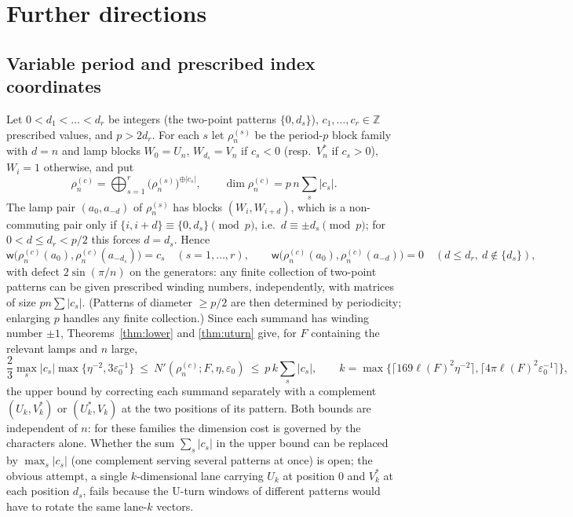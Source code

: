\documentclass[11pt]{amsart}
\theoremstyle{definition}
\theoremstyle{remark}
\newcommand{\Z}{\mathbb Z}
\newcommand{\wind}{\mathsf w}
\newcommand{\lamp}{a}
\begin{document}
\section{Further directions}\label{sec:further}

\subsection{Variable period and prescribed index coordinates}\label{sec:prescribed}

Let $0<d_1<\dots<d_r$ be integers (the two-point patterns $\{0,d_s\}$), $c_1,\dots,c_r\in\Z$ prescribed values, and $p>2d_r$. For each $s$ let $\rho^{(s)}_n$ be the period-$p$ block family with $d=n$ and lamp blocks $W_0=U_n$, $W_{d_s}=V_n$ if $c_s<0$ (resp.\ $V_n^*$ if $c_s>0$), $W_i=1$ otherwise, and put
\begin{equation}\label{eq:prescribed}
\rho_n^{(c)}=\bigoplus_{s=1}^r\bigl(\rho^{(s)}_n\bigr)^{\oplus|c_s|},\qquad \dim\rho_n^{(c)}=p\,n\sum_s|c_s| .
\end{equation}
The lamp pair $(\lamp_0,\lamp_{-d})$ of $\rho^{(s)}_n$ has blocks $(W_i,W_{i+d})$, which is a non-commuting pair only if $\{i,i+d\}\equiv\{0,d_s\}\pmod p$, i.e.\ $d\equiv\pm d_s\pmod p$; for $0<d\le d_r<p/2$ this forces $d=d_s$. Hence
\[
\wind\bigl(\rho_n^{(c)}(\lamp_0),\rho_n^{(c)}(\lamp_{-d_s})\bigr)=c_s\quad(s=1,\dots,r),\qquad \wind\bigl(\rho_n^{(c)}(\lamp_0),\rho_n^{(c)}(\lamp_{-d})\bigr)=0\quad(d\le d_r,\ d\notin\{d_s\}),
\]
with defect $2\sin(\pi/n)$ on the generators: any finite collection of two-point patterns can be given prescribed winding numbers, independently, with matrices of size $pn\sum|c_s|$. (Patterns of diameter $\ge p/2$ are then determined by periodicity; enlarging $p$ handles any finite collection.) Since each summand has winding number $\pm1$, Theorems~\ref{thm:lower} and \ref{thm:uturn} give, for $F$ containing the relevant lamps and $n$ large,
\begin{equation}\label{eq:prescribedcost}
\frac23\max_s|c_s|\max\{\eta^{-2},3\varepsilon_0^{-1}\}\ \le\ N'(\rho_n^{(c)};F,\eta,\varepsilon_0)\ \le\ p\,k\sum_s|c_s|,\qquad k=\max\{\lceil169\ell(F)^2\eta^{-2}\rceil,\lceil4\pi\ell(F)^2\varepsilon_0^{-1}\rceil\},
\end{equation}
the upper bound by correcting each summand separately with a complement $(U_k,V_k^*)$ or $(U_k^*,V_k)$ at the two positions of its pattern. Both bounds are independent of $n$: for these families the dimension cost is governed by the characters alone. Whether the sum $\sum_s|c_s|$ in the upper bound can be replaced by $\max_s|c_s|$ (one complement serving several patterns at once) is open; the obvious attempt, a single $k$-dimensional lane carrying $U_k$ at position $0$ and $V_k^*$ at each position $d_s$, fails because the U-turn windows of different patterns would have to rotate the same lane-$k$ vectors.
\end{document}
